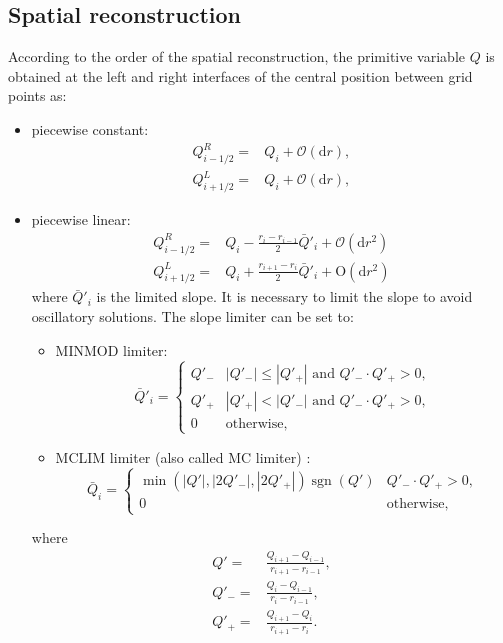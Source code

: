 \documentclass[aps,prd,twocolumn,a4paper,floatfix,nofootbib,superscriptaddress,nofootinbib]{revtex4}
\DeclareMathOperator{\sgn}{sgn}
\begin{document}
\subsection{Spatial reconstruction}
\label{ssec:reconstruction}

According to the order of the spatial reconstruction,
the primitive variable $Q$ is obtained at the left and right
interfaces of the central position between grid points as:
%
\begin{itemize}
\item[1st:] piecewise constant:
\begin{align}
\label{eq:constant}
Q^R_{i-1/2}={}& Q_i + \mathcal O(\mathrm dr),\\
Q^L_{i+1/2}={}& Q_i + \mathcal O(\mathrm dr),
\end{align}
%
\item[2nd:] piecewise linear:
\begin{align}
\label{eq:linear}
Q^R_{i-1/2}={}& Q_i - \frac{r_i-r_{i-1}}2\bar Q'_i + \mathcal O(\mathrm dr^2)\\
Q^L_{i+1/2}={}& Q_i + \frac{r_{i+1}-r_i}2\bar Q'_i + \mathrm O(\mathrm dr^2)
\end{align}
where $\bar Q'_i$ is the limited slope. It is necessary to limit the slope to
avoid oscillatory solutions.  The slope limiter can be set to:
\begin{itemize}
\item MINMOD limiter:
\begin{equation}
\bar Q'_i=\begin{cases}
Q'_{-} & |Q'_{-}| \le |Q'_{+}| \mbox{ and } Q'_{-}\cdot Q'_{+} > 0,\\
Q'_{+} & |Q'_{+}| < |Q'_{-}| \mbox{ and } Q'_{-}\cdot Q'_{+} > 0,\\
0 & \mbox{otherwise},
\end{cases}
\end{equation}
\item MCLIM limiter (also called MC limiter) \cite{vanLeer77}:
\begin{equation}
\bar Q_i=\begin{cases}
\min(|Q'|,|2Q'_{-}|,|2Q'_{+}|)\sgn(Q') & Q'_{-}\cdot Q'_{+}>0,\\
0 & \mbox{otherwise},
\end{cases}
\end{equation}
\end{itemize}
where
\begin{align}
Q'={}&\frac{Q_{i+1}-Q_{i-1}}{r_{i+1}-r_{i-1}},\\
Q'_{-}={}&\frac{Q_i - Q_{i-1}}{r_i - r_{i-1}},\\
Q'_{+}={}&\frac{Q_{i+1} - Q_i}{r_{i+1} - r_i}.
\end{align}
\end{itemize}
\end{document}
